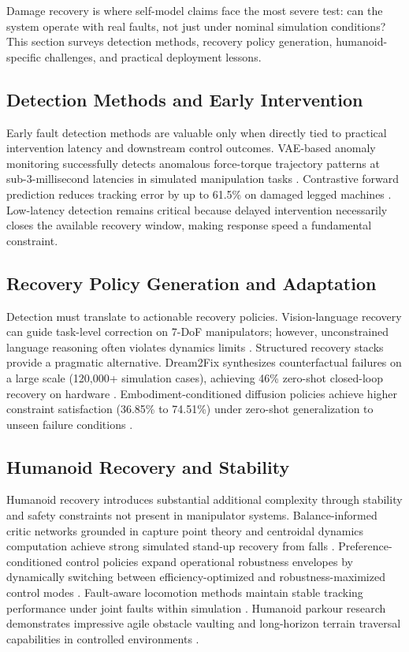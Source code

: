 ﻿\documentclass[12pt,a4paper,oneside]{report}
\begin{document}
Damage recovery is where self-model claims face the most severe test: can the system operate with real faults, not just under nominal simulation conditions? This section surveys detection methods, recovery policy generation, humanoid-specific challenges, and practical deployment lessons.

\subsection{Detection Methods and Early Intervention}

Early fault detection methods are valuable only when directly tied to practical intervention latency and downstream control outcomes. VAE-based anomaly monitoring successfully detects anomalous force-torque trajectory patterns at sub-3-millisecond latencies in simulated manipulation tasks \cite{grambow2026anomaly}. Contrastive forward prediction reduces tracking error by up to 61.5\% on damaged legged machines \cite{fu2025contrastive}. Low-latency detection remains critical because delayed intervention necessarily closes the available recovery window, making response speed a fundamental constraint.

\subsection{Recovery Policy Generation and Adaptation}

Detection must translate to actionable recovery policies. Vision-language recovery can guide task-level correction on 7-DoF manipulators; however, unconstrained language reasoning often violates dynamics limits \cite{chen2024vlm}. Structured recovery stacks provide a pragmatic alternative. Dream2Fix synthesizes counterfactual failures on a large scale (120,000+ simulation cases), achieving 46\% zero-shot closed-loop recovery on hardware \cite{li2025dream2fix}. Embodiment-conditioned diffusion policies achieve higher constraint satisfaction (36.85\% to 74.51\%) under zero-shot generalization to unseen failure conditions \cite{briscoe2025deft}.

\subsection{Humanoid Recovery and Stability}

Humanoid recovery introduces substantial additional complexity through stability and safety constraints not present in manipulator systems. Balance-informed critic networks grounded in capture point theory and centroidal dynamics computation achieve strong simulated stand-up recovery from falls \cite{poddar2026embedding}. Preference-conditioned control policies expand operational robustness envelopes by dynamically switching between efficiency-optimized and robustness-maximized control modes \cite{li2026pchc}. Fault-aware locomotion methods maintain stable tracking performance under joint faults within simulation \cite{lee2026tolebi}. Humanoid parkour research demonstrates impressive agile obstacle vaulting and long-horizon terrain traversal capabilities in controlled environments \cite{wu2026parkour}.
\end{document}
